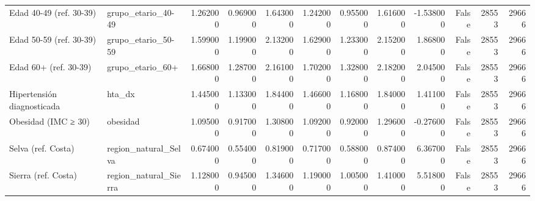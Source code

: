\begin{table}[htbp]
\begin{tabular}{llrrrrrrrrrr}
Edad 40-49 (ref. 30-39) & grupo\_etario\_40-49 & 1.262000 & 0.969000 & 1.643000 & 1.242000 & 0.955000 & 1.616000 & -1.538000 & False & 28553 & 29666 \\
Edad 50-59 (ref. 30-39) & grupo\_etario\_50-59 & 1.599000 & 1.199000 & 2.132000 & 1.629000 & 1.233000 & 2.152000 & 1.868000 & False & 28553 & 29666 \\
Edad 60+ (ref. 30-39) & grupo\_etario\_60+ & 1.668000 & 1.287000 & 2.161000 & 1.702000 & 1.328000 & 2.182000 & 2.045000 & False & 28553 & 29666 \\
Hipertensión diagnosticada & hta\_dx & 1.445000 & 1.133000 & 1.844000 & 1.466000 & 1.168000 & 1.840000 & 1.411000 & False & 28553 & 29666 \\
Obesidad (IMC ≥ 30) & obesidad & 1.095000 & 0.917000 & 1.308000 & 1.092000 & 0.920000 & 1.296000 & -0.276000 & False & 28553 & 29666 \\
Selva (ref. Costa) & region\_natural\_Selva & 0.674000 & 0.554000 & 0.819000 & 0.717000 & 0.588000 & 0.874000 & 6.367000 & False & 28553 & 29666 \\
Sierra (ref. Costa) & region\_natural\_Sierra & 1.128000 & 0.945000 & 1.346000 & 1.190000 & 1.005000 & 1.410000 & 5.518000 & False & 28553 & 29666 \\
\bottomrule
\end{tabular}
\end{table}
